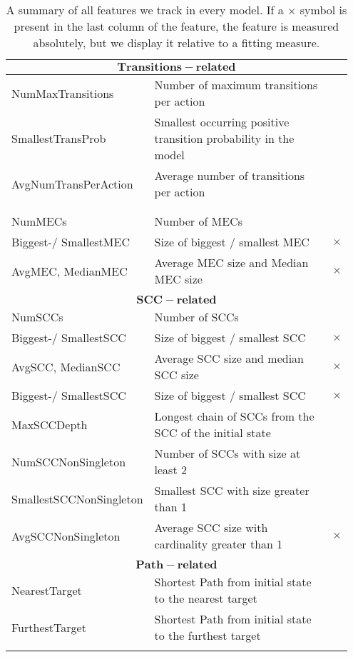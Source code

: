 \begin{longtable}{| p{0.3\linewidth} | p{0.6\linewidth} | p{0.05\linewidth} |}
        \multicolumn{3}{|c|}{$\mathbf{Transitions-related}$} \\\hline
        NumMaxTransitions & Number of maximum transitions per action & \\
        SmallestTransProb & Smallest occurring positive transition probability in the model &  \\
        AvgNumTransPerAction & Average number of transitions per action & \\\hline\multicolumn{3}{c}{}\\[-0.5em]\hline
        \pagebreak
        \multicolumn{3}{|c|}{$\mathbf{MEC-related}$} \\\hline
        NumMECs & Number of MECs & \\
        Biggest-/ SmallestMEC & Size of biggest / smallest MEC & $\times$ \\
        AvgMEC, MedianMEC & Average MEC size and Median MEC size & $\times$ \\\hline\multicolumn{3}{c}{}\\[-0.5em]\hline

        \multicolumn{3}{|c|}{$\mathbf{SCC-related}$} \\\hline
        NumSCCs & Number of SCCs & \\
        Biggest-/ SmallestSCC & Size of biggest / smallest SCC & $\times$ \\
        AvgSCC, MedianSCC & Average SCC size and median SCC size & $\times$ \\
        Biggest-/ SmallestSCC & Size of biggest / smallest SCC & $\times$ \\
        MaxSCCDepth & Longest chain of SCCs from the SCC of the initial state & \\
        NumSCCNonSingleton & Number of SCCs with size at least 2 & \\
        SmallestSCCNonSingleton & Smallest SCC with size greater than 1 & \\
        AvgSCCNonSingleton & Average SCC size with cardinality greater than 1 & $\times$ \\\hline\multicolumn{3}{c}{}\\[-0.5em]\hline

        \multicolumn{3}{|c|}{$\mathbf{Path-related}$} \\\hline
        NearestTarget & Shortest Path from initial state to the nearest target & \\
        FurthestTarget & Shortest Path from initial state to the furthest target &  \\\hline
        \caption{A summary of all features we track in every model. If a $\times$ symbol is present in the last column of the feature,
        the feature is measured absolutely, but we display it relative to a fitting measure.}
        \label{tab:modelFeatures}
    \end{longtable}

